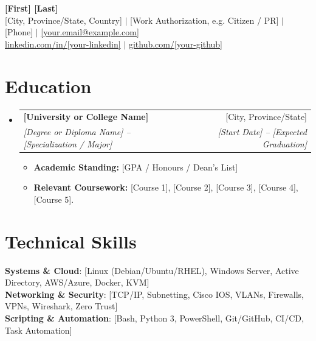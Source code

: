 \documentclass[letterpaper,10pt]{article}
\makeatletter
\newcommand{\resumeItem}[1]{
  \item\small{
    {#1 \vspace{-2pt}}
  }
}
\newcommand{\resumeSubheading}[4]{
  \vspace{-2pt}\item
    \begin{tabular*}{0.97\textwidth}[t]{l@{\extracolsep{\fill}}r}
      \textbf{#1} & #2 \\
      \textit{\small#3} & \textit{\small #4} \\
    \end{tabular*}\vspace{-7pt}
}
\newcommand{\resumeSubHeadingListStart}{\begin{itemize}[leftmargin=0.15in, label={}]}
\newcommand{\resumeSubHeadingListEnd}{\end{itemize}}
\newcommand{\resumeItemListStart}{\begin{itemize}}
\newcommand{\resumeItemListEnd}{\end{itemize}\vspace{-5pt}}
\makeatother
\begin{document}
\begin{center}
    \Huge \textbf{[First] [Last]} \\ \vspace{2pt}
    \small [City, Province/State, Country] $|$ [Work Authorization, e.g. Citizen / PR] $|$ [Phone] $|$ \href{mailto:[your.email@example.com]}{[your.email@example.com]} \\ \vspace{1pt}
    \href{https://linkedin.com/in/[your-linkedin]}{linkedin.com/in/[your-linkedin]} $|$
    \href{https://github.com/[your-github]}{github.com/[your-github]}
\end{center}

\section{Education}
  \resumeSubHeadingListStart
    \resumeSubheading
      {[University or College Name]}{[City, Province/State]}
      {[Degree or Diploma Name] -- [Specialization / Major]}{[Start Date] -- [Expected Graduation]}
      \resumeItemListStart
        \resumeItem{\textbf{Academic Standing:} [GPA / Honours / Dean's List]}
        \resumeItem{\textbf{Relevant Coursework:} [Course 1], [Course 2], [Course 3], [Course 4], [Course 5].}
      \resumeItemListEnd
  \resumeSubHeadingListEnd

\section{Technical Skills}
 \begin{itemize}[leftmargin=0.15in, label={}]
    \small{\item{
     \textbf{Systems \& Cloud}{: [Linux (Debian/Ubuntu/RHEL), Windows Server, Active Directory, AWS/Azure, Docker, KVM]} \\ \vspace{1pt}
     \textbf{Networking \& Security}{: [TCP/IP, Subnetting, Cisco IOS, VLANs, Firewalls, VPNs, Wireshark, Zero Trust]} \\ \vspace{1pt}
     \textbf{Scripting \& Automation}{: [Bash, Python 3, PowerShell, Git/GitHub, CI/CD, Task Automation]}
    }}
 \end{itemize}
 \vspace{-6pt}

\end{document}
